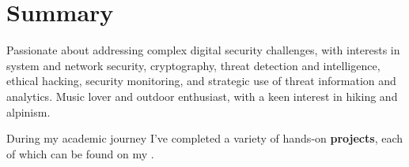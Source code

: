 \section{Summary}


    \begin{onecolentry}
        Passionate about addressing complex digital security challenges, with interests in system and network security, cryptography, threat detection and intelligence, ethical hacking, security monitoring, and strategic use of threat information and analytics.
        Music lover and outdoor enthusiast, with a keen interest in hiking and alpinism.
    \end{onecolentry}

    \vspace{0.1 cm} %

    \begin{onecolentry}
        During my academic journey I've completed a variety of hands-on \textbf{projects}, each of which can be found on my \hspace{0em} \mbox{}.
    \end{onecolentry}
